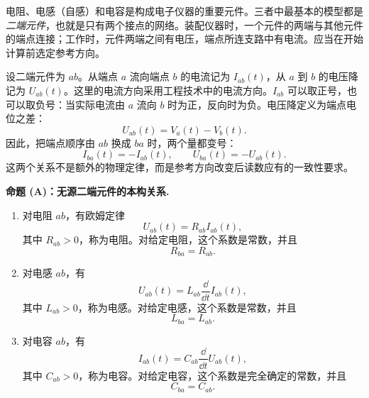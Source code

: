 电阻、电感（自感）和电容是构成电子仪器的重要元件。三者中最基本的模型都是\emph{二端元件}，也就是只有两个接点的网络。装配仪器时，一个元件的两端与其他元件的端点连接；工作时，元件两端之间有电压，端点所连支路中有电流。应当在开始计算前选定参考方向。

设二端元件为 \(ab\)。从端点 \(a\) 流向端点 \(b\) 的电流记为 \(I_{ab}(t)\)，从 \(a\) 到 \(b\) 的电压降记为 \(U_{ab}(t)\)。这里的电流方向采用工程技术中的电流方向。\(I_{ab}\) 可以取正号，也可以取负号：当实际电流由 \(a\) 流向 \(b\) 时为正，反向时为负。电压降定义为端点电位之差：
\begin{equation}
 U_{ab}(t)=V_a(t)-V_b(t).
 \label{eq:ch2-13-voltage-potential}
\end{equation}
因此，把端点顺序由 \(ab\) 换成 \(ba\) 时，两个量都变号：
\begin{equation}
 I_{ba}(t)=-I_{ab}(t),
 \qquad
 U_{ba}(t)=-U_{ab}(t).
 \label{eq:ch2-13-reversed-signs}
\end{equation}
这两个关系不是额外的物理定律，而是参考方向改变后读数应有的一致性要求。

\medskip
\noindent\textbf{命题 (A)：无源二端元件的本构关系.}
\begin{enumerate}[label=(\arabic*)]
 \item 对电阻 \(ab\)，有欧姆定律
 \begin{equation}
  U_{ab}(t)=R_{ab}I_{ab}(t),
  \label{eq:ch2-13-ohm}
 \end{equation}
 其中 \(R_{ab}>0\)，称为电阻。对给定电阻，这个系数是常数，并且
 \begin{equation}
  R_{ba}=R_{ab}.
  \label{eq:ch2-13-resistance-symmetry}
 \end{equation}
 \item 对电感 \(ab\)，有
 \begin{equation}
  U_{ab}(t)=L_{ab}\frac{\dd}{\dd t}I_{ab}(t),
  \label{eq:ch2-13-inductance}
 \end{equation}
 其中 \(L_{ab}>0\)，称为电感。对给定电感，这个系数是常数，并且
 \begin{equation}
  L_{ba}=L_{ab}.
  \label{eq:ch2-13-inductance-symmetry}
 \end{equation}
 \item 对电容 \(ab\)，有
 \begin{equation}
  I_{ab}(t)=C_{ab}\frac{\dd}{\dd t}U_{ab}(t),
  \label{eq:ch2-13-capacitance}
 \end{equation}
 其中 \(C_{ab}>0\)，称为电容。对给定电容，这个系数是完全确定的常数，并且
 \begin{equation}
  C_{ba}=C_{ab}.
  \label{eq:ch2-13-capacitance-symmetry}
 \end{equation}
\end{enumerate}

